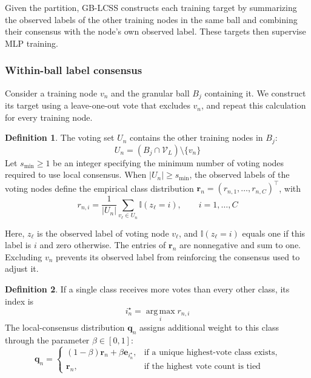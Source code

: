 \documentclass[10pt,letterpaper,nopreprintline]{elsarticle}
\theoremstyle{definition}
\newtheorem{definition}{Definition}
\theoremstyle{plain}
\begin{document}
Given the partition, GB-LCSS constructs each training target by summarizing the observed labels of the other training nodes in the same ball and combining their consensus with the node's own observed label. These targets then supervise MLP training.

\subsubsection{Within-ball label consensus}\label{sec:3.3.1}

Consider a training node \(v_n\) and the granular ball \(B_j\) containing it. We construct its target using a leave-one-out vote that excludes \(v_n\), and repeat this calculation for every training node.

\begin{definition}
The voting set \(U_n\) contains the other training nodes in \(B_j\):
\begin{equation}\label{eq:7}
U_n=(B_j\cap\mathcal V_L)\setminus\{v_n\}
\end{equation}
Let \(s_{\min}\geq1\) be an integer specifying the minimum number of voting nodes required to use local consensus. When \(|U_n|\geq s_{\min}\), the observed labels of the voting nodes define the empirical class distribution \(\mathbf r_n=(r_{n,1},\ldots,r_{n,C})^\top\), with
\begin{equation}\label{eq:8}
r_{n,i}=\frac{1}{|U_n|}\sum_{v_\ell\in U_n}\mathbb I(z_\ell=i),
\qquad i=1,\ldots,C
\end{equation}
\end{definition}

Here, \(z_\ell\) is the observed label of voting node \(v_\ell\), and \(\mathbb I(z_\ell=i)\) equals one if this label is \(i\) and zero otherwise. The entries of \(\mathbf r_n\) are nonnegative and sum to one. Excluding \(v_n\) prevents its observed label from reinforcing the consensus used to adjust it.

\Needspace{64pt}
\begin{definition}
If a single class receives more votes than every other class, its index is
\begin{equation}\label{eq:9}
i_n^\star=\operatorname*{arg\,max}_i r_{n,i}
\end{equation}
The local-consensus distribution \(\mathbf q_n\) assigns additional weight to this class through the parameter \(\beta\in[0,1]\):
\begin{equation}\label{eq:10}
\mathbf q_n=
\begin{cases}
(1-\beta)\mathbf r_n+\beta\mathbf e_{i_n^\star},&\text{if a unique highest-vote class exists},\\
\mathbf r_n,&\text{if the highest vote count is tied}
\end{cases}
\end{equation}
\end{definition}
\end{document}
